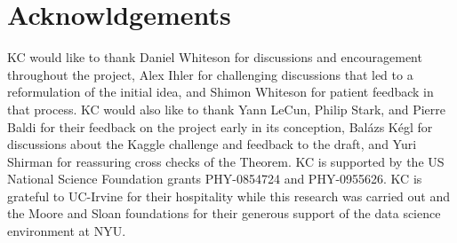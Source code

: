 \documentclass[11pt, oneside]{article}   	%
\begin{document}
\section*{Acknowldgements}
KC would like to thank  
Daniel Whiteson for discussions and encouragement throughout the project, 
Alex Ihler for challenging discussions that 
led to a reformulation of the initial idea, and Shimon Whiteson for patient feedback in that process. 
KC would also like to thank Yann LeCun, Philip Stark, and Pierre Baldi for their feedback on the
project early in its conception, Bal\'azs K\'egl for discussions about the Kaggle challenge and feedback to the draft, 
and Yuri Shirman for reassuring cross checks of the Theorem.
KC is supported by the US National Science Foundation grants PHY-0854724 and PHY-0955626. 
KC is grateful to UC-Irvine for their hospitality while this research was carried out and the 
Moore and Sloan foundations for their generous support of the data science environment at NYU.



\end{document}
